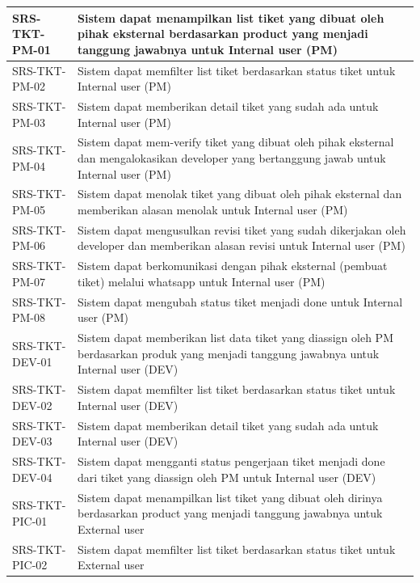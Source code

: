 \documentclass[12pt]{article}
\begin{document}
\begin{enumerate}[label=\textbf{4.\arabic*.}]
\begin{enumerate}[label=\textbf{4.1.\arabic*.}]
\begin{longtable}{|l|p{}|}
            SRS-TKT-PM-01 & Sistem dapat menampilkan list tiket yang dibuat oleh pihak eksternal berdasarkan product yang menjadi tanggung jawabnya untuk Internal user (PM)\\
            \hline
            SRS-TKT-PM-02 & Sistem dapat memfilter list tiket berdasarkan status tiket untuk Internal user (PM)\\
            \hline
            SRS-TKT-PM-03 & Sistem dapat memberikan detail tiket yang sudah ada untuk Internal user (PM)\\
            \hline
            SRS-TKT-PM-04 & Sistem dapat mem-verify tiket yang dibuat oleh pihak eksternal dan mengalokasikan developer yang bertanggung jawab untuk Internal user (PM)\\
            \hline
            SRS-TKT-PM-05 & Sistem dapat menolak tiket yang dibuat oleh pihak eksternal dan memberikan alasan menolak untuk Internal user (PM)\\
            \hline
            SRS-TKT-PM-06 & Sistem dapat mengusulkan revisi tiket yang sudah dikerjakan oleh developer dan memberikan alasan revisi untuk Internal user (PM)\\
            \hline
            SRS-TKT-PM-07 & Sistem dapat berkomunikasi dengan pihak eksternal (pembuat tiket) melalui whatsapp untuk Internal user (PM)\\
            \hline
            SRS-TKT-PM-08 & Sistem dapat mengubah status tiket menjadi done untuk Internal user (PM)\\
            \hline
            SRS-TKT-DEV-01 & Sistem dapat memberikan list data tiket yang diassign oleh PM berdasarkan produk yang menjadi tanggung jawabnya untuk Internal user (DEV)\\
            \hline
            SRS-TKT-DEV-02 & Sistem dapat memfilter list tiket berdasarkan status tiket untuk Internal user (DEV)\\
            \hline
            SRS-TKT-DEV-03 & Sistem dapat memberikan detail tiket yang sudah ada untuk Internal user (DEV)\\
            \hline
            SRS-TKT-DEV-04 & Sistem dapat mengganti status pengerjaan tiket menjadi done dari tiket yang diassign oleh PM untuk Internal user (DEV)\\
            \hline
            SRS-TKT-PIC-01 & Sistem dapat menampilkan list tiket yang dibuat oleh dirinya berdasarkan product yang menjadi tanggung jawabnya untuk External user\\
            \hline
            SRS-TKT-PIC-02 & Sistem dapat memfilter list tiket berdasarkan status tiket untuk External user\\

\end{longtable}
\end{enumerate}
\end{enumerate}
\end{document}
